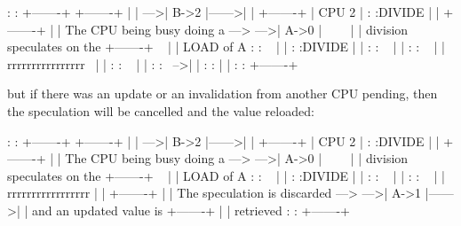 \begin{VerbatimU}
	                                        :       :       +-------+
	                                        +-------+       |       |
	                                    --->| B->2  |------>|       |
	                                        +-------+       | CPU 2 |
	                                        :       :DIVIDE |       |
	                                        +-------+       |       |
	The CPU being busy doing a --->     --->| A->0  |~~~~   |       |
	division speculates on the              +-------+   ~   |       |
	LOAD of A                               :       :   ~   |       |
	                                        :       :DIVIDE |       |
	                                        :       :   ~   |       |
	                                        :       :   ~   |       |
	                                    rrrrrrrrrrrrrrrr~   |       |
	                                        :       :   ~   |       |
	                                        :       :   ~-->|       |
	                                        :       :       |       |
	                                        :       :       +-------+
\end{VerbatimU}

\noindent%
but if there was an update or an invalidation from another CPU pending, then
the speculation will be cancelled and the value reloaded:

\begin{VerbatimU}
	                                        :       :       +-------+
	                                        +-------+       |       |
	                                    --->| B->2  |------>|       |
	                                        +-------+       | CPU 2 |
	                                        :       :DIVIDE |       |
	                                        +-------+       |       |
	The CPU being busy doing a --->     --->| A->0  |~~~~   |       |
	division speculates on the              +-------+   ~   |       |
	LOAD of A                               :       :   ~   |       |
	                                        :       :DIVIDE |       |
	                                        :       :   ~   |       |
	                                        :       :   ~   |       |
	                                    rrrrrrrrrrrrrrrrr   |       |
	                                        +-------+       |       |
	The speculation is discarded --->   --->| A->1  |------>|       |
	and an updated value is                 +-------+       |       |
	retrieved                               :       :       +-------+
\end{VerbatimU}


